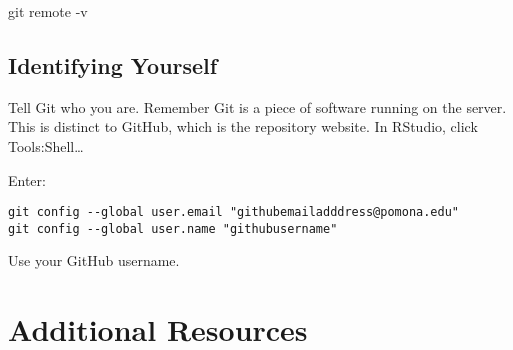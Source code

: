 \documentclass{article}\usepackage[]{graphicx}\usepackage[]{color}
\begin{document}
git remote -v



\subsection{ Identifying Yourself}

Tell Git who you are. Remember Git is a piece of software running on the server. This is distinct to GitHub, which is the repository website. In RStudio, click Tools:Shell\ldots

\noindent Enter:

\begin{verbatim}
git config --global user.email "githubemailadddress@pomona.edu"
git config --global user.name "githubusername"
\end{verbatim}

Use your GitHub username.

\section{Additional Resources}
\end{document}
